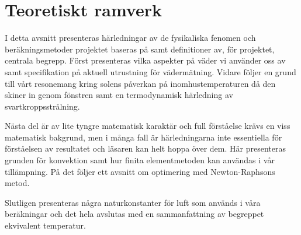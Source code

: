 \chapter{Teoretiskt ramverk}

I detta avsnitt presenteras härledningar av de fysikaliska fenomen och beräkningsmetoder projektet baseras på samt definitioner av, för projektet, centrala begrepp. Först presenteras vilka aspekter på väder vi använder oss av samt specifikation på aktuell utrustning för vädermätning. Vidare följer en grund till vårt resonemang kring solens påverkan på inomhustemperaturen då den skiner in genom fönstren samt en termodynamisk härledning av svartkroppsstrålning.

Nästa del är av lite tyngre matematisk karaktär och full förståelse krävs en viss matematisk bakgrund, men i många fall är härledningarna inte essentiella för förståelsen av resultatet och läsaren kan helt hoppa över dem. Här presenteras grunden för konvektion samt hur finita elementmetoden kan användas i vår tillämpning. På det följer ett avsnitt om optimering med Newton-Raphsons metod. 

Slutligen presenteras några naturkonstanter för luft som används i våra beräkningar och det hela avslutas med en sammanfattning av begreppet ekvivalent temperatur.












